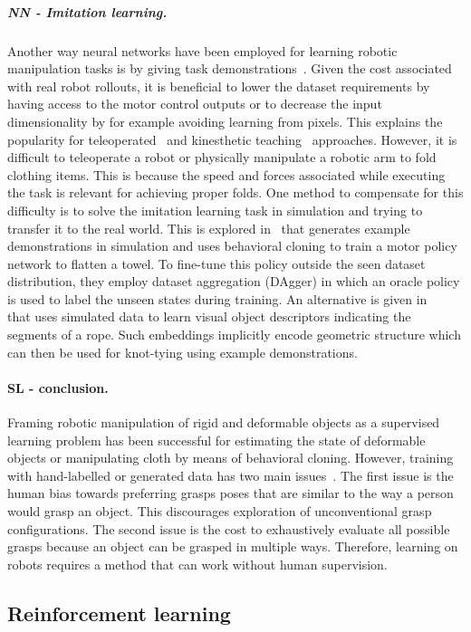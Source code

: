 \documentclass[\home/main.tex]{subfiles}
\begin{document}
\subparagraph{NN - Imitation learning.}
Another way neural networks have been employed for learning robotic manipulation tasks is by giving task demonstrations~\autocite{Ravichandar2020}. Given the cost associated with real robot rollouts, it is beneficial to lower the dataset requirements by having access to the motor control outputs or to decrease the input dimensionality by for example avoiding learning from pixels. This explains the popularity for teleoperated~\autocite{Zhang2018,Duan2017} and kinesthetic teaching~\autocite{finn2017one} approaches. However, it is difficult to teleoperate a robot or physically manipulate a robotic arm to fold clothing items. This is because the speed and forces associated while executing the task is relevant for achieving proper folds. One method to compensate for this difficulty is to solve the imitation learning task in simulation and trying to transfer it to the real world. This is explored in~\autocite{Seita2020} that generates example demonstrations in simulation and uses behavioral cloning to train a motor policy network to flatten a towel. To fine-tune this policy outside the seen dataset distribution, they employ dataset aggregation (DAgger) in which an oracle policy is used to label the unseen states during training. An alternative is given in ~\autocite{Sundaresan2020} that uses simulated data to learn visual object descriptors indicating the segments of a rope. Such embeddings implicitly encode geometric structure which can then be used for knot-tying using example demonstrations.

\paragraph{SL - conclusion.}
Framing robotic manipulation of rigid and deformable objects as a supervised learning problem has been successful for estimating the state of deformable objects or manipulating cloth by means of behavioral cloning. However, training with hand-labelled or generated data has two main issues~\autocite{pinto2016supersizing}. The first issue is the human bias towards preferring grasps poses that are similar to the way a person would grasp an object. This discourages exploration of unconventional grasp configurations. The second issue is the cost to exhaustively evaluate all possible grasps because an object can be grasped in multiple ways. Therefore, learning on robots requires a method that can work without human supervision.

\subsection{Reinforcement learning} \label{subsec:lit_rl}
\end{document}
